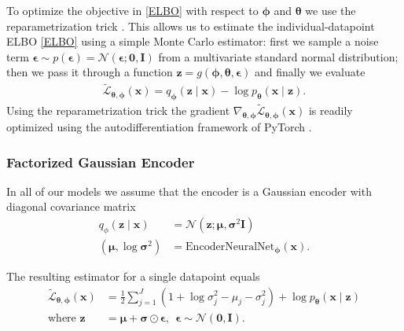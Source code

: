 To optimize the objective in \eqref{ELBO} with respect to $\bm{\phi}$ and $\bm{\theta}$
we use the reparametrization trick \cite{Kingma_2019}.
This allows us to estimate the individual-datapoint ELBO \eqref{ELBO} 
using a simple Monte Carlo estimator:
first we sample a noise term $\bm{\epsilon} \sim p(\bm{\epsilon}) = \mathcal{N}(\bm{\epsilon}; \bm{0}, \bm{I})$ from a multivariate standard normal distribution; then we pass it through a function 
$\mathbf{z} = g(\bm{\phi}, \bm{\theta}, \bm{\epsilon})$ and finally we evaluate 
\begin{align}
    \label{sp-ELBO}
    \tilde{\mathcal{L}}_{\bm{\theta}, \bm{\phi}}(\mathbf{x}) 
    =
    q_{\bm{\phi}}(\mathbf{z} \mid  \mathbf{x}) -
    \log p_{\bm{\theta}}(\mathbf{x} \mid  \mathbf{z}).
\end{align}
Using the reparametrization trick the gradient $
    \nabla_{\bm{\theta}, \bm{\phi}}\tilde{\mathcal{L}}_{\bm{\theta}, \bm{\phi}}(\mathbf{x}) 
$
is readily optimized using the autodifferentiation framework of PyTorch \cite{pytorch}.

\subsubsection*{Factorized Gaussian Encoder}
In all of our models we assume that the encoder 
is a Gaussian encoder with diagonal covariance matrix 
\begin{align}
    q_{\phi}(\mathbf{z} \mid \mathbf{x}) 
    &= \mathcal{N}(\mathbf{z}; \bm{\mu}, \bm{\sigma}^2 \mathbf{I}) \\ 
    (\bm{\mu}, \log \bm{\sigma}^2) 
    &= \mathrm{EncoderNeuralNet}_{\bm{\phi}}(\mathbf{x}).
\end{align}

The resulting estimator for a single datapoint equals 
\begin{align}\label{eq7}
    \tilde{\mathcal{L}}_{\bm{\theta}, \bm{\phi}}(\mathbf{x}) 
    &=
    \frac{1}{2} \sum_{j=1}^{J} \left( 
    1 + \log \sigma^2_j - \mu_{j} - \sigma^2_{j}
    \right) 
    + \log p_{\bm{\theta}}(\mathbf{x} \mid  \mathbf{z}) \\ 
    \text{where  }  \mathbf{z} &= \bm{\mu} + \bm{\sigma} \odot \bm{\epsilon}, \ \
    \bm{\epsilon} \sim  \mathcal{N}(\bm{0}, \bm{I}).
\end{align}

